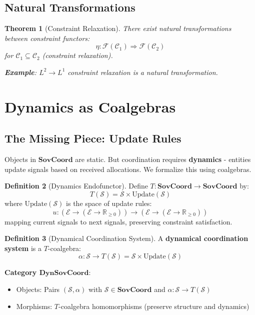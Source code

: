 \documentclass[11pt,a4paper]{article}
\newtheorem{theorem}{Theorem}[section]
\theoremstyle{definition}
\newtheorem{definition}[theorem]{Definition}
\theoremstyle{remark}
\newcommand{\E}{\mathcal{E}}
\newcommand{\C}{\mathcal{C}}
\newcommand{\SovCoord}{\mathbf{SovCoord}}
\begin{document}
\subsection{Natural Transformations}

\begin{theorem}[Constraint Relaxation]
There exist natural transformations between constraint functors:
\[ \eta: \mathcal{F}(\C_1) \Rightarrow \mathcal{F}(\C_2) \]
for $\C_1 \subseteq \C_2$ (constraint relaxation).

\textbf{Example}: $L^2 \to L^1$ constraint relaxation is a natural transformation.
\end{theorem}

\section{Dynamics as Coalgebras}

\subsection{The Missing Piece: Update Rules}

Objects in $\SovCoord$ are static. But coordination requires \textbf{dynamics} - entities update signals based on received allocations. We formalize this using coalgebras.

\begin{definition}[Dynamics Endofunctor]
Define $T: \SovCoord \to \SovCoord$ by:
\[ T(\mathcal{S}) = \mathcal{S} \times \text{Update}(\mathcal{S}) \]
where $\text{Update}(\mathcal{S})$ is the space of update rules:
\[ u: (\E \to (\E \to \mathbb{R}_{\ge 0})) \to (\E \to (\E \to \mathbb{R}_{\ge 0})) \]
mapping current signals to next signals, preserving constraint satisfaction.
\end{definition}

\begin{definition}[Dynamical Coordination System]
A \textbf{dynamical coordination system} is a $T$-coalgebra:
\[ \alpha: \mathcal{S} \to T(\mathcal{S}) = \mathcal{S} \times \text{Update}(\mathcal{S}) \]

\textbf{Category $\mathbf{DynSovCoord}$}:
\begin{itemize}
\item Objects: Pairs $(\mathcal{S}, \alpha)$ with $\mathcal{S} \in \SovCoord$ and $\alpha: \mathcal{S} \to T(\mathcal{S})$
\item Morphisms: $T$-coalgebra homomorphisms (preserve structure and dynamics)
\end{itemize}
\end{definition}
\end{document}
